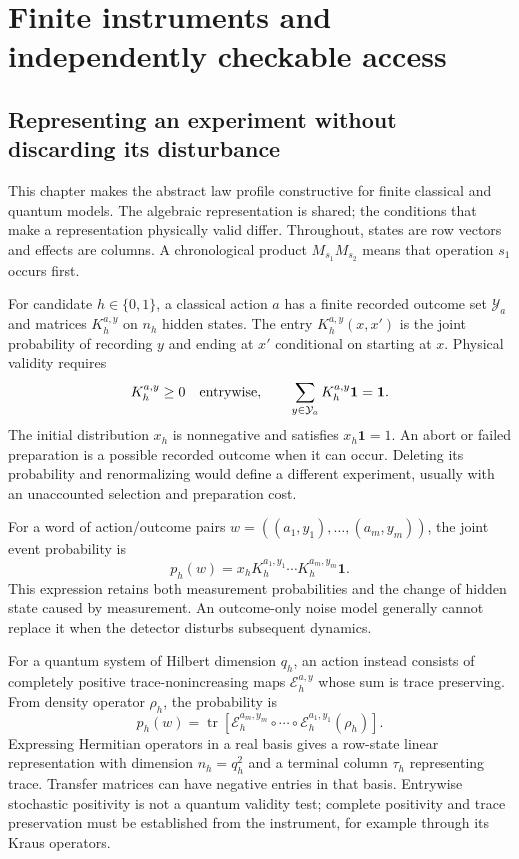 \chapter{Finite instruments and independently checkable access}
\label{finite:chapter}

\section{Representing an experiment without discarding its disturbance}

This chapter makes the abstract law profile constructive for finite
classical and quantum models. The algebraic representation is shared; the
conditions that make a representation physically valid differ. Throughout,
states are row vectors and effects are columns. A chronological product
$M_{s_1}M_{s_2}$ means that operation $s_1$ occurs first.

For candidate $h\in\{0,1\}$, a classical action $a$ has a finite recorded
outcome set $\mathcal Y_a$ and matrices $K_h^{a,y}$ on $n_h$ hidden states.
The entry $K_h^{a,y}(x,x')$ is the joint probability of recording $y$ and
ending at $x'$ conditional on starting at $x$. Physical validity requires
\begin{equation}\label{finite:classical}
 K_h^{a,y}\geq0\quad\hbox{entrywise},\qquad
 \sum_{y\in\mathcal Y_a}K_h^{a,y}\mathbf1=\mathbf1.
\end{equation}
The initial distribution $x_h$ is nonnegative and satisfies $x_h\mathbf1=1$.
An abort or failed preparation is a possible recorded outcome when it can
occur. Deleting its probability and renormalizing would define a different
experiment, usually with an unaccounted selection and preparation cost.

For a word of action/outcome pairs
$w=((a_1,y_1),\ldots,(a_m,y_m))$, the joint event probability is
\begin{equation}\label{finite:probability}
 p_h(w)=x_hK_h^{a_1,y_1}\cdots K_h^{a_m,y_m}\mathbf1.
\end{equation}
This expression retains both measurement probabilities and the change of
hidden state caused by measurement. An outcome-only noise model generally
cannot replace it when the detector disturbs subsequent dynamics.

For a quantum system of Hilbert dimension $q_h$, an action instead consists
of completely positive trace-nonincreasing maps
$\mathcal E_h^{a,y}$ whose sum is trace preserving. From density operator
$\rho_h$, the probability is
\begin{equation}
 p_h(w)=\operatorname{tr}\!\left[
 \mathcal E_h^{a_m,y_m}\circ\cdots\circ
 \mathcal E_h^{a_1,y_1}(\rho_h)\right].
\end{equation}
Expressing Hermitian operators in a real basis gives a row-state linear
representation with dimension $n_h=q_h^2$ and a terminal column $\tau_h$
representing trace. Transfer matrices can have negative entries in that
basis. Entrywise stochastic positivity is not a quantum validity test;
complete positivity and trace preservation must be established from the
instrument, for example through its Kraus operators.

